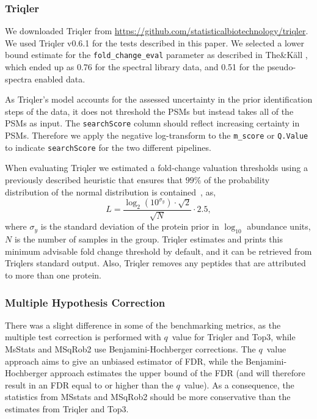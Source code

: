 \documentclass[10pt,letterpaper]{article}
\begin{document}
\subsubsection*{Triqler}

We downloaded Triqler from \url{https://github.com/statisticalbiotechnology/triqler}. We used Triqler v0.6.1 for the tests described in this paper. We selected a lower bound estimate for the \texttt{fold\_change\_eval} parameter as described in The\&K\"{a}ll \cite{the2021triqler}, which ended up as 0.76 for the spectral library data, and 0.51 for the pseudo-spectra enabled data.

As Triqler's model accounts for the assessed uncertainty in the prior identification steps of the data, it does not threshold the PSMs but instead takes all of the PSMs as input. The \texttt{searchScore} column should reflect increasing certainty in PSMs. Therefore we apply the negative log-transform to the \texttt{m\_score} or \texttt{Q.Value} to indicate \texttt{searchScore} for the two different pipelines. 

When evaluating Triqler we estimated a fold-change valuation thresholds using a previously described heuristic that ensures that $99\%$ of the 
probability distribution of the normal distribution is contained~\cite{the2021triqler}, as,
\begin{equation}
 L = \frac{\log_2 \left( 10^{\sigma_y} \right) \cdot \sqrt{2}}{\sqrt{N}} \cdot 
2.5,
\end{equation}
where $\sigma_y$ is the standard deviation of the protein prior in $\log_{10}$ 
abundance units, $N$ is the number of samples in the group. Triqler estimates and prints this minimum advisable fold change threshold by default, and it can be retrieved from Triqlers standard output.
Also, Triqler removes any peptides that are attributed to more than one protein.

\subsubsection*{Multiple Hypothesis Correction}

There was a slight difference in some of the benchmarking metrics, as the multiple test correction is performed with $q$~value for Triqler and Top3, while MsStats and MSqRob2 use Benjamini-Hochberger \cite{benjamini1995controlling} corrections. The $q$~value approach aims to give an unbiased estimator of FDR, while the Benjamini-Hochberger approach estimates the upper bound of the FDR (and will therefore result in an FDR equal to or higher than the $q$~value). As a consequence, the statistics from MSstats and MSqRob2 should be more conservative than the estimates from Triqler and Top3\cite{korthauer2019practical}.
\end{document}
